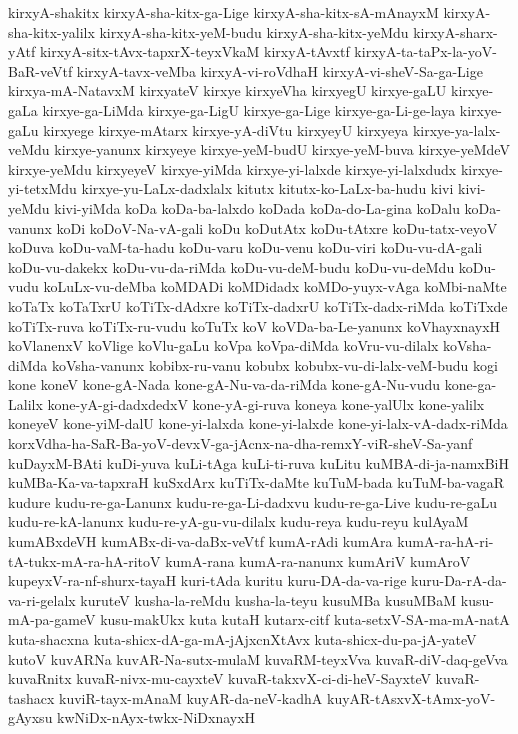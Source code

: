 {kirxyA-shakitx
kirxyA-sha-kitx-ga-Lige
kirxyA-sha-kitx-sA-mAnayxM
kirxyA-sha-kitx-yalilx
kirxyA-sha-kitx-yeM-budu
kirxyA-sha-kitx-yeMdu
kirxyA-sharx-yAtf
kirxyA-sitx-tAvx-tapxrX-teyxVkaM
kirxyA-tAvxtf
kirxyA-ta-taPx-la-yoV-BaR-veVtf
kirxyA-tavx-veMba
kirxyA-vi-roVdhaH
kirxyA-vi-sheV-Sa-ga-Lige
kirxya-mA-NatavxM
kirxyateV
kirxye
kirxyeVha
kirxyegU
kirxye-gaLU
kirxye-gaLa
kirxye-ga-LiMda
kirxye-ga-LigU
kirxye-ga-Lige
kirxye-ga-Li-ge-laya
kirxye-gaLu
kirxyege
kirxye-mAtarx
kirxye-yA-diVtu
kirxyeyU
kirxyeya
kirxye-ya-lalx-veMdu
kirxye-yanunx
kirxyeye
kirxye-yeM-budU
kirxye-yeM-buva
kirxye-yeMdeV
kirxye-yeMdu
kirxyeyeV
kirxye-yiMda
kirxye-yi-lalxde
kirxye-yi-lalxdudx
kirxye-yi-tetxMdu
kirxye-yu-LaLx-dadxlalx
kitutx
kitutx-ko-LaLx-ba-hudu
kivi
kivi-yeMdu
kivi-yiMda
koDa
koDa-ba-lalxdo
koDada
koDa-do-La-gina
koDalu
koDa-vanunx
koDi
koDoV-Na-vA-gali
koDu
koDutAtx
koDu-tAtxre
koDu-tatx-veyoV
koDuva
koDu-vaM-ta-hadu
koDu-varu
koDu-venu
koDu-viri
koDu-vu-dA-gali
koDu-vu-dakekx
koDu-vu-da-riMda
koDu-vu-deM-budu
koDu-vu-deMdu
koDu-vudu
koLuLx-vu-deMba
koMDADi
koMDidadx
koMDo-yuyx-vAga
koMbi-naMte
koTaTx
koTaTxrU
koTiTx-dAdxre
koTiTx-dadxrU
koTiTx-dadx-riMda
koTiTxde
koTiTx-ruva
koTiTx-ru-vudu
koTuTx
koV
koVDa-ba-Le-yanunx
koVhayxnayxH
koVlanenxV
koVlige
koVlu-gaLu
koVpa
koVpa-diMda
koVru-vu-dilalx
koVsha-diMda
koVsha-vanunx
kobibx-ru-vanu
kobubx
kobubx-vu-di-lalx-veM-budu
kogi
kone
koneV
kone-gA-Nada
kone-gA-Nu-va-da-riMda
kone-gA-Nu-vudu
kone-ga-Lalilx
kone-yA-gi-dadxdedxV
kone-yA-gi-ruva
koneya
kone-yalUlx
kone-yalilx
koneyeV
kone-yiM-dalU
kone-yi-lalxda
kone-yi-lalxde
kone-yi-lalx-vA-dadx-riMda
korxVdha-ha-SaR-Ba-yoV-devxV-ga-jAcnx-na-dha-remxY-viR-sheV-Sa-yanf
kuDayxM-BAti
kuDi-yuva
kuLi-tAga
kuLi-ti-ruva
kuLitu
kuMBA-di-ja-namxBiH
kuMBa-Ka-va-tapxraH
kuSxdArx
kuTiTx-daMte
kuTuM-bada
kuTuM-ba-vagaR
kudure
kudu-re-ga-Lanunx
kudu-re-ga-Li-dadxvu
kudu-re-ga-Live
kudu-re-gaLu
kudu-re-kA-lanunx
kudu-re-yA-gu-vu-dilalx
kudu-reya
kudu-reyu
kulAyaM
kumABxdeVH
kumABx-di-va-daBx-veVtf
kumA-rAdi
kumAra
kumA-ra-hA-ri-tA-tukx-mA-ra-hA-ritoV
kumA-rana
kumA-ra-nanunx
kumAriV
kumAroV
kupeyxV-ra-nf-shurx-tayaH
kuri-tAda
kuritu
kuru-DA-da-va-rige
kuru-Da-rA-da-va-ri-gelalx
kuruteV
kusha-la-reMdu
kusha-la-teyu
kusuMBa
kusuMBaM
kusu-mA-pa-gameV
kusu-makUkx
kuta
kutaH
kutarx-citf
kuta-setxV-SA-ma-mA-natA
kuta-shacxna
kuta-shicx-dA-ga-mA-jAjxcnXtAvx
kuta-shicx-du-pa-jA-yateV
kutoV
kuvARNa
kuvAR-Na-sutx-mulaM
kuvaRM-teyxVva
kuvaR-diV-daq-geVva
kuvaRnitx
kuvaR-nivx-mu-cayxteV
kuvaR-takxvX-ci-di-heV-SayxteV
kuvaR-tashacx
kuviR-tayx-mAnaM
kuyAR-da-neV-kadhA
kuyAR-tAsxvX-tAmx-yoV-gAyxsu
kwNiDx-nAyx-twkx-NiDxnayxH
}
